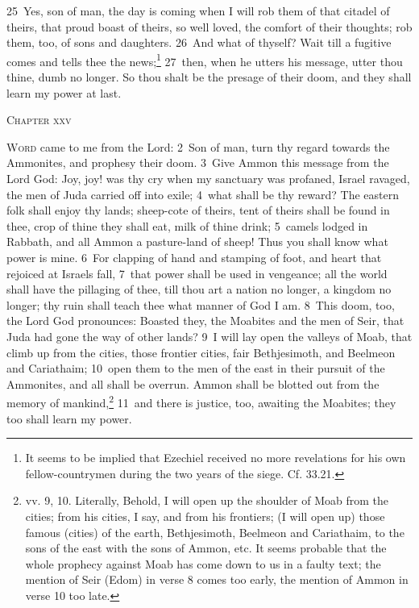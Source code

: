 \documentclass[10pt]{book} %
\begin{document}
\textcolor{benred8}{25}~Yes, son of man, the day is coming when I will rob them of that citadel of theirs, that proud boast of theirs, so well loved, the comfort of their thoughts; rob them, too, of sons and daughters. \textcolor{benred8}{26}~And what of thyself? Wait till a fugitive comes and tells thee the news;\footnote[6]{It seems to be implied that Ezechiel received no more revelations for his own fellow-countrymen during the two years of the siege. Cf. 33.21.} \textcolor{benred8}{27}~then, when he utters his message, utter thou thine, dumb no longer. So thou shalt be the presage of their doom, and they shall learn my power at last.
\begin{large}\begin{center}\textsc{Chapter xxv}\end{center}\end{large}
\lettrine[lines=2]{W}{ord} came to me from the Lord: \textcolor{benred8}{2}~Son of man, turn thy regard towards the Ammonites, and prophesy their doom. \textcolor{benred8}{3}~Give Ammon this message from the Lord God: Joy, joy! was thy cry when my sanctuary was profaned, Israel ravaged, the men of Juda carried off into exile; \textcolor{benred8}{4}~what shall be thy reward? The eastern folk shall enjoy thy lands; sheep-cote of theirs, tent of theirs shall be found in thee, crop of thine they shall eat, milk of thine drink; \textcolor{benred8}{5}~camels lodged in Rabbath, and all Ammon a pasture-land of sheep! Thus you shall know what power is mine. \textcolor{benred8}{6}~For clapping of hand and stamping of foot, and heart that rejoiced at Israel\textquotesingle s fall, \textcolor{benred8}{7}~that power shall be used in vengeance; all the world shall have the pillaging of thee, till thou art a nation no longer, a kingdom no longer; thy ruin shall teach thee what manner of God I am.
\textcolor{benred8}{8}~This doom, too, the Lord God pronounces: Boasted they, the Moabites and the men of Seir, that Juda had gone the way of other lands? \textcolor{benred8}{9}~I will lay open the valleys of Moab, that climb up from the cities, those frontier cities, fair Bethjesimoth, and Beelmeon and Cariathaim; \textcolor{benred8}{10}~open them to the men of the east in their pursuit of the Ammonites, and all shall be overrun. Ammon shall be blotted out from the memory of mankind,\footnote[1]{vv. 9, 10. Literally, \textasciigrave Behold, I will open up the shoulder of Moab from the cities; from his cities, I say, and from his frontiers; (I will open up) those famous (cities) of the earth, Bethjesimoth, Beelmeon and Cariathaim, to the sons of the east with the sons of Ammon\textquotesingle , etc. It seems probable that the whole prophecy against Moab has come down to us in a faulty text; the mention of Seir (Edom) in verse 8 comes too early, the mention of Ammon in verse 10 too late.} \textcolor{benred8}{11}~and there is justice, too, awaiting the Moabites; they too shall learn my power.
\end{document}
